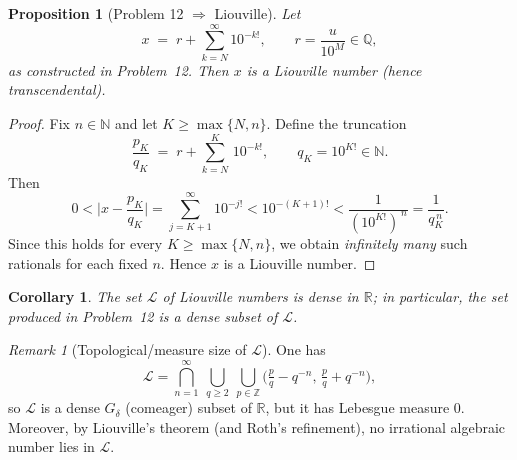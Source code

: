 \documentclass[12pt,a4paper]{article}
\theoremstyle{plain}
\newtheorem{proposition}[theorem]{Proposition}
\newtheorem{corollary}[theorem]{Corollary}
\theoremstyle{definition}
\theoremstyle{remark}
\newtheorem*{remark}{Remark} %
\theoremstyle{remark}
\begin{document}
\begin{proposition}[Problem 12 $\Rightarrow$ Liouville]
	Let
	\[
	x \;=\; r+\sum_{k=N}^{\infty}10^{-k!}, \qquad r=\frac{u}{10^M}\in\mathbb Q,
	\]
	as constructed in Problem~12. Then $x$ is a Liouville number (hence transcendental).
\end{proposition}

\begin{proof}
	Fix $n\in\mathbb N$ and let $K\ge\max\{N,n\}$. Define the truncation
	\[
	\frac{p_K}{q_K} \;=\; r+\sum_{k=N}^{K}\,10^{-k!}, \qquad q_K=10^{K!}\in\mathbb N.
	\]
	Then
	\[
	0<\Big|x-\frac{p_K}{q_K}\Big|
	=\sum_{j=K+1}^{\infty}10^{-j!}
	<10^{-(K+1)!}
	<\frac{1}{(10^{K!})^{\,n}}
	=\frac{1}{q_K^{\,n}}.
	\]
	Since this holds for every $K\ge\max\{N,n\}$, we obtain \emph{infinitely many} such rationals
	for each fixed $n$. Hence $x$ is a Liouville number.
\end{proof}

\begin{corollary}
	The set $\mathcal L$ of Liouville numbers is dense in $\mathbb R$; in particular,
	the set produced in Problem~12 is a dense subset of $\mathcal L$.
\end{corollary}

\begin{remark}[Topological/measure size of $\mathcal L$]
	One has
	\[
	\mathcal L
	= \bigcap_{n=1}^{\infty}\ \bigcup_{q\ge2}\ \bigcup_{p\in\mathbb Z}
	\Big(\tfrac{p}{q}-q^{-n},\,\tfrac{p}{q}+q^{-n}\Big),
	\]
	so $\mathcal L$ is a dense $G_\delta$ (comeager) subset of $\mathbb R$, but it has Lebesgue measure $0$.
	Moreover, by Liouville's theorem (and Roth's refinement), no irrational algebraic number lies in $\mathcal L$.
\end{remark}


	
	
\end{document}
